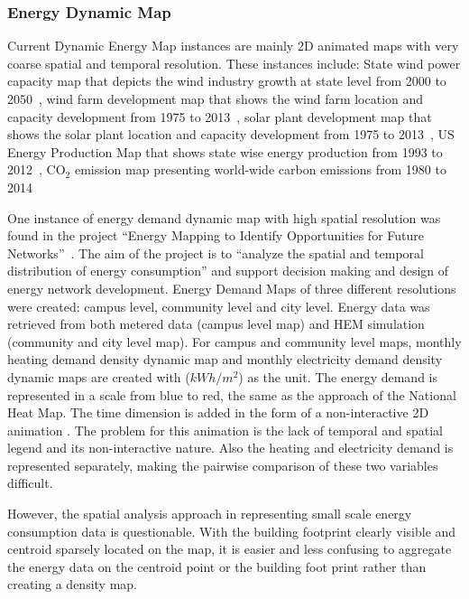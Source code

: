 \documentclass[hidelinks,12pt]{article}
\begin{document}
\subsubsection{Energy Dynamic Map}
Current Dynamic Energy Map instances are mainly 2D animated maps with
very coarse spatial and temporal resolution. These instances include:
State wind power capacity map that depicts the wind industry growth at
state level from 2000 to 2050~\cite{DOEWind}, wind farm development
map that shows the wind farm location and capacity development from
1975 to 2013~\cite{DOEWindFarm}, solar plant development map that
shows the solar plant location and capacity development from 1975 to
2013~\cite{DOESolarPlant}, US Energy Production Map that shows state
wise energy production from 1993 to 2012~\cite{DOEEnergyProduct},
CO$_2$ emission map presenting world-wide carbon emissions from 1980
to 2014~\cite{CO2Atlas}

One instance of energy demand dynamic map with high spatial resolution
was found in the project ``Energy Mapping to Identify Opportunities
for Future Networks''~\cite{Diaz2013}. The aim of the project is to
``analyze the spatial and temporal distribution of energy
consumption'' and support decision making and design of energy network
development. Energy Demand Maps of three different resolutions were
created: campus level, community level and city level. Energy data was
retrieved from both metered data (campus level map) and HEM simulation
(community and city level map). For campus and community level maps,
monthly heating demand density dynamic map and monthly electricity
demand density dynamic maps are created with ($kWh/m^2$) as the
unit. The energy demand is represented in a scale from blue to red,
the same as the approach of the National Heat Map. The time
dimension is added in the form of a non-interactive 2D animation . The
problem for this animation is the lack of temporal and spatial legend
and its non-interactive nature. Also the heating and electricity
demand is represented separately, making the pairwise comparison of
these two variables difficult.

However, the spatial analysis approach in representing small scale
energy consumption data is questionable. With the building footprint
clearly visible and centroid sparsely located on the map, it is easier
and less confusing to aggregate the energy data on the centroid point
or the building foot print rather than creating a density map.
\end{document}

